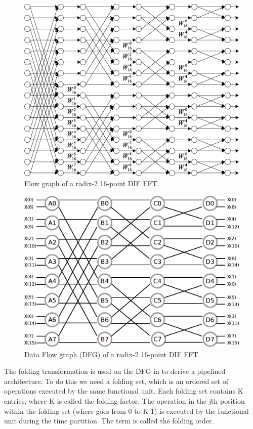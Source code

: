 \documentclass[journal,comsoc]{IEEEtran}
\begin{document}
\begin{figure}[htbp]
\centering
\includegraphics[width=\linewidth]{Diagramas/fft16.png}%
\caption{Flow graph of a radix-2 16-point DIF FFT.}
\label{fig:flowgraph_16}
\end{figure}

\begin{figure}[htbp]%
\centering
\includegraphics[width=\linewidth]{Diagramas/Butter16.eps}
\caption{Data Flow graph (DFG) of a radix-2 16-point DIF FFT.}
\label{fig:dfg_16}
\end{figure}

The folding transformation is used on the DFG in to derive a pipelined architecture. To do this we need a folding set, which is an ordered set of operations executed by the same functional unit. Each folding set contains K entries, where K is called the folding factor. The operation in the \textit{j}th position within the folding set (where goes from 0 to K-1) is executed by the functional unit during the time partition. The term is called the folding order.
\end{document}
